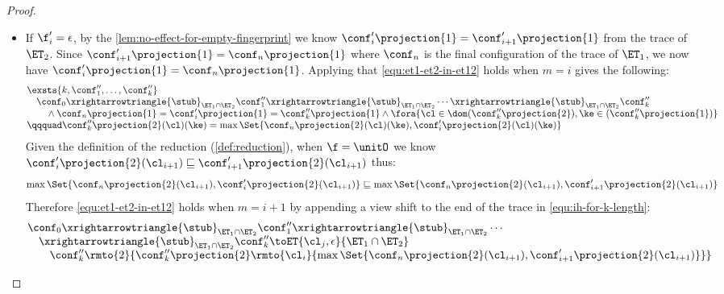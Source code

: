 \begin{proof}
\begin{itemize}
\begin{itemize}
    \item If \( \f'_i = \epsilon \), by the \cref{lem:no-effect-for-empty-fingerprint} we know \( \conf'_{i}\projection{1} = \conf'_{i+1}\projection{1}\) from the trace of \( \ET_2 \).
Since \( \conf'_{i+1}\projection{1} = \conf_n\projection{1}\) where \( \conf_n \) is the final configuration of the trace of \( \ET_1 \), we now have \( \conf'_{i}\projection{1} = \conf_n\projection{1}\).
Applying \ih that \cref{equ:et1-et2-in-et12} holds when \( m = i \) gives the following:
\begin{equation}
    \label{equ:ih-for-k-length}
    \begin{array}{@{}l@{}}
    \exsts{k, \conf''_1, \dots, \conf''_k} \\
    \quad \conf_0 \xrightarrowtriangle{\stub}_{\ET_1 \cap \ET_2} \conf''_1 \xrightarrowtriangle{\stub}_{\ET_1 \cap \ET_2} \cdots \xrightarrowtriangle{\stub}_{\ET_1 \cap \ET_2} \conf''_k  \\
    \qquad {} \land \conf_n\projection{1} = \conf'_i\projection{1} = \conf''_k\projection{1}
    \land \fora{\cl \in \dom(\conf''_k\projection{2}),\ke \in (\conf''_k\projection{1})} \\
    \qqquad \conf''_k\projection{2}(\cl)(\ke) = \max\Set{\conf_n\projection{2}(\cl)(\ke), \conf'_i\projection{2}(\cl)(\ke)}
\end{array}
\end{equation}
Given the definition of the reduction (\cref{def:reduction}), when \( \f = \unitO \) we know \( \conf'_i\projection{2}(\cl_{i+1}) \sqsubseteq  \conf'_{i+1}\projection{2}(\cl_{i+1})\) thus:
\begin{equation}
    \label{equ:preserve-max-view}
    \max\Set{\conf_n\projection{2}(\cl_{i+1}), \conf'_i\projection{2}(\cl_{i+1})} \sqsubseteq \max\Set{\conf_n\projection{2}(\cl_{i+1}), \conf'_{i+1}\projection{2}(\cl_{i+1})}
\end{equation}
Therefore \cref{equ:et1-et2-in-et12} holds when \( m = i + 1\) by appending a view shift to the end of the trace in \cref{equ:ih-for-k-length}:
\[
    \begin{array}{@{}l}
    \conf_0 \xrightarrowtriangle{\stub}_{\ET_1 \cap \ET_2} \conf''_1 \xrightarrowtriangle{\stub}_{\ET_1 \cap \ET_2} \cdots \\
    \quad \xrightarrowtriangle{\stub}_{\ET_1 \cap \ET_2} \conf''_k \toET{\cl_{j}, \epsilon }{\ET_1 \cap \ET_2} \\
    \qquad \conf''_k\rmto{2}{\conf''_k\projection{2}\rmto{\cl_{i}}{\max\Set{\conf_n\projection{2}(\cl_{i+1}), \conf'_{i+1}\projection{2}(\cl_{i+1})} }}
    \end{array}
\]


\end{itemize}
\end{itemize}
\end{proof}
